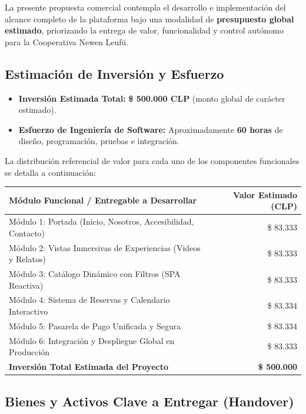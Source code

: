 \documentclass[11pt,a4paper]{article}
\begin{document}
La presente propuesta comercial contempla el desarrollo e implementación del alcance completo de la plataforma bajo una modalidad de \textbf{presupuesto global estimado}, priorizando la entrega de valor, funcionalidad y control autónomo para la Cooperativa Newen Leufü.

\subsection*{Estimación de Inversión y Esfuerzo}
\begin{itemize}
    \item \textbf{Inversión Estimada Total:} \textbf{\$ 500.000 CLP} (monto global de carácter estimado).
    \item \textbf{Esfuerzo de Ingeniería de Software:} Aproximadamente \textbf{60 horas} de diseño, programación, pruebas e integración.
\end{itemize}

\vspace{0.3cm}
La distribución referencial de valor para cada uno de los componentes funcionales se detalla a continuación:

\vspace{0.3cm}
\begin{center}
    \renewcommand{\arraystretch}{1.3}
    \begin{tabularx}{0.95\textwidth}{|X|r|}
    \hline
    \textbf{Módulo Funcional / Entregable a Desarrollar} & \textbf{Valor Estimado (CLP)} \\
    \hline
    Módulo 1: Portada (Inicio, Nosotros, Accesibilidad, Contacto) & \$ 83.333 \\
    Módulo 2: Vistas Inmersivas de Experiencias (Videos y Relatos) & \$ 83.333 \\
    Módulo 3: Catálogo Dinámico con Filtros (SPA Reactiva) & \$ 83.333 \\
    Módulo 4: Sistema de Reservas y Calendario Interactivo & \$ 83.334 \\
    Módulo 5: Pasarela de Pago Unificada y Segura & \$ 83.334 \\
    Módulo 6: Integración y Despliegue Global en Producción & \$ 83.333 \\
    \hline
    \textbf{Inversión Total Estimada del Proyecto} & \textbf{\$ 500.000} \\
    \hline
    \end{tabularx}
\end{center}

\subsection*{Bienes y Activos Clave a Entregar (Handover)}
\end{document}
